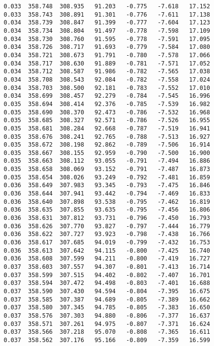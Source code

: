 \begin{verbatim}
   0.033  358.748  308.935   91.203   -0.775   -7.618   17.152
   0.033  358.743  308.891   91.301   -0.776   -7.611   17.138
   0.034  358.739  308.847   91.399   -0.777   -7.604   17.123
   0.034  358.734  308.804   91.497   -0.778   -7.598   17.109
   0.034  358.730  308.760   91.595   -0.778   -7.591   17.095
   0.034  358.726  308.717   91.693   -0.779   -7.584   17.080
   0.034  358.721  308.673   91.791   -0.780   -7.578   17.066
   0.034  358.717  308.630   91.889   -0.781   -7.571   17.052
   0.034  358.712  308.587   91.986   -0.782   -7.565   17.038
   0.034  358.708  308.543   92.084   -0.782   -7.558   17.024
   0.034  358.703  308.500   92.181   -0.783   -7.552   17.010
   0.034  358.699  308.457   92.279   -0.784   -7.545   16.996
   0.035  358.694  308.414   92.376   -0.785   -7.539   16.982
   0.035  358.690  308.370   92.473   -0.786   -7.532   16.968
   0.035  358.685  308.327   92.571   -0.786   -7.526   16.955
   0.035  358.681  308.284   92.668   -0.787   -7.519   16.941
   0.035  358.676  308.241   92.765   -0.788   -7.513   16.927
   0.035  358.672  308.198   92.862   -0.789   -7.506   16.914
   0.035  358.667  308.155   92.959   -0.790   -7.500   16.900
   0.035  358.663  308.112   93.055   -0.791   -7.494   16.886
   0.035  358.658  308.069   93.152   -0.791   -7.487   16.873
   0.035  358.654  308.026   93.249   -0.792   -7.481   16.859
   0.036  358.649  307.983   93.345   -0.793   -7.475   16.846
   0.036  358.644  307.941   93.442   -0.794   -7.469   16.833
   0.036  358.640  307.898   93.538   -0.795   -7.462   16.819
   0.036  358.635  307.855   93.635   -0.795   -7.456   16.806
   0.036  358.631  307.812   93.731   -0.796   -7.450   16.793
   0.036  358.626  307.770   93.827   -0.797   -7.444   16.779
   0.036  358.622  307.727   93.923   -0.798   -7.438   16.766
   0.036  358.617  307.685   94.019   -0.799   -7.432   16.753
   0.036  358.613  307.642   94.115   -0.800   -7.425   16.740
   0.036  358.608  307.599   94.211   -0.800   -7.419   16.727
   0.037  358.603  307.557   94.307   -0.801   -7.413   16.714
   0.037  358.599  307.515   94.402   -0.802   -7.407   16.701
   0.037  358.594  307.472   94.498   -0.803   -7.401   16.688
   0.037  358.590  307.430   94.594   -0.804   -7.395   16.675
   0.037  358.585  307.387   94.689   -0.805   -7.389   16.662
   0.037  358.580  307.345   94.785   -0.805   -7.383   16.650
   0.037  358.576  307.303   94.880   -0.806   -7.377   16.637
   0.037  358.571  307.261   94.975   -0.807   -7.371   16.624
   0.037  358.566  307.218   95.070   -0.808   -7.365   16.611
   0.037  358.562  307.176   95.166   -0.809   -7.359   16.599

\end{verbatim}
